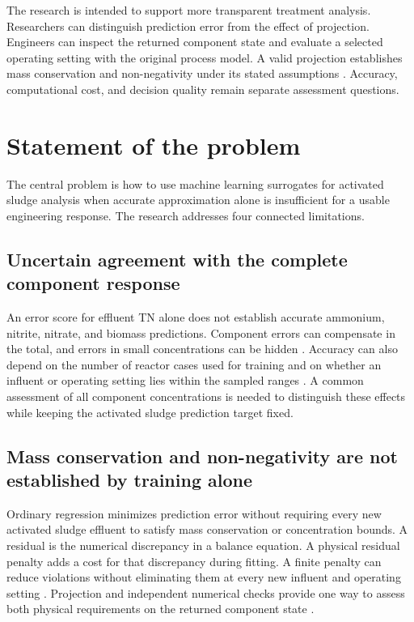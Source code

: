 The research is intended to support more transparent treatment analysis. Researchers can distinguish prediction error from the effect of projection. Engineers can inspect the returned component state and evaluate a selected operating setting with the original process model. A valid projection establishes mass conservation and non-negativity under its stated assumptions \citep{KircherVotsmeier2025,Selerio2026}. Accuracy, computational cost, and decision quality remain separate assessment questions.

\section{Statement of the problem}

The central problem is how to use machine learning surrogates for activated sludge analysis when accurate approximation alone is insufficient for a usable engineering response. The research addresses four connected limitations.

\subsection{Uncertain agreement with the complete component response}

An error score for effluent TN alone does not establish accurate ammonium, nitrite, nitrate, and biomass predictions. Component errors can compensate in the total, and errors in small concentrations can be hidden \citep{Henze2006,Selerio2026}. Accuracy can also depend on the number of reactor cases used for training and on whether an influent or operating setting lies within the sampled ranges \citep{VieringLoog2023,Li2024}. A common assessment of all component concentrations is needed to distinguish these effects while keeping the activated sludge prediction target fixed.

\subsection{Mass conservation and non-negativity are not established by training alone}

Ordinary regression minimizes prediction error without requiring every new activated sludge effluent to satisfy mass conservation or concentration bounds. A residual is the numerical discrepancy in a balance equation. A physical residual penalty adds a cost for that discrepancy during fitting. A finite penalty can reduce violations without eliminating them at every new influent and operating setting \citep{Raissi2019,Hansen2024}. Projection and independent numerical checks provide one way to assess both physical requirements on the returned component state \citep{KircherVotsmeier2025,Selerio2026}.


